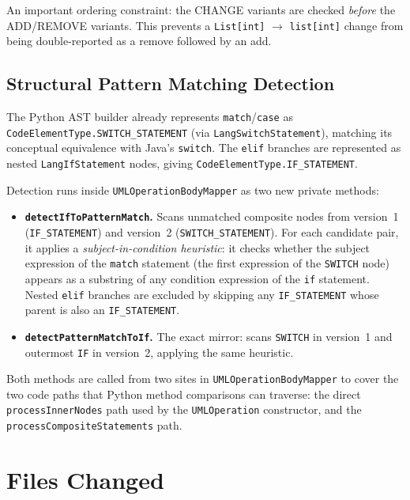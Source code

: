 \documentclass[11pt,a4paper]{article}
\newcommand{\code}[1]{\texttt{#1}}
\begin{document}
An important ordering constraint: the CHANGE variants are checked \emph{before} the ADD/REMOVE variants. This prevents a \code{List[int]} $\to$ \code{list[int]} change from being double-reported as a remove followed by an add.

\subsection{Structural Pattern Matching Detection}

The Python AST builder already represents \code{match}/\code{case} as \code{Code\-Element\-Type.\-SWITCH\_STATEMENT} (via \code{LangSwitchStatement}), matching its conceptual equivalence with Java's \code{switch}. The \code{elif} branches are represented as nested \code{LangIfStatement} nodes, giving \code{CodeElementType.IF\_STATEMENT}.

Detection runs inside \code{UMLOperationBodyMapper} as two new private methods:

\begin{itemize}[leftmargin=*]
  \item \textbf{\code{detectIfToPatternMatch}.} Scans unmatched composite nodes from version~1 (\code{IF\_STATEMENT}) and version~2 (\code{SWITCH\_STATEMENT}). For each candidate pair, it applies a \emph{subject-in-condition heuristic}: it checks whether the subject expression of the \code{match} statement (the first expression of the \code{SWITCH} node) appears as a substring of any condition expression of the \code{if} statement. Nested \code{elif} branches are excluded by skipping any \code{IF\_STATEMENT} whose parent is also an \code{IF\_STATEMENT}.

  \item \textbf{\code{detectPatternMatchToIf}.} The exact mirror: scans \code{SWITCH} in version~1 and outermost \code{IF} in version~2, applying the same heuristic.
\end{itemize}

Both methods are called from two sites in \code{UMLOperationBodyMapper} to cover the two code paths that Python method comparisons can traverse: the direct \code{processInnerNodes} path used by the \code{UMLOperation} constructor, and the \code{processCompositeStatements} path.

\section{Files Changed}
\end{document}
